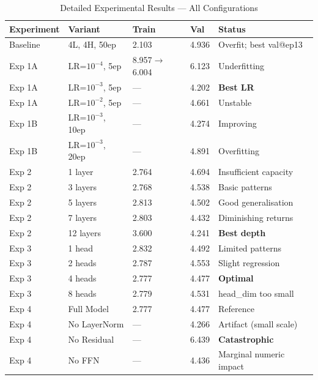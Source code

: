 \documentclass[12pt,a4paper]{article}
\begin{document}
\begin{table}[H]
\centering
\caption{Detailed Experimental Results — All Configurations}
\small\renewcommand{\arraystretch}{1.3}
\begin{tabular}{L{2.2cm}L{3cm}C{2cm}C{2cm}L{4cm}}
  \toprule
  \textbf{Experiment} & \textbf{Variant} & \textbf{Train} & \textbf{Val} & \textbf{Status} \\
  \midrule
  Baseline    & 4L, 4H, 50ep              & 2.103 & 4.936 & Overfit; best val@ep13 \\
  \midrule
  Exp 1A      & LR=$10^{-4}$, 5ep         & 8.957$\to$6.004 & 6.123 & Underfitting \\
  Exp 1A      & LR=$10^{-3}$, 5ep         & — & 4.202 & \textbf{Best LR} \\
  Exp 1A      & LR=$10^{-2}$, 5ep         & — & 4.661 & Unstable \\
  Exp 1B      & LR=$10^{-3}$, 10ep        & — & 4.274 & Improving \\
  Exp 1B      & LR=$10^{-3}$, 20ep        & — & 4.891 & Overfitting \\
  \midrule
  Exp 2       & 1 layer                   & 2.764 & 4.694 & Insufficient capacity \\
  Exp 2       & 3 layers                  & 2.768 & 4.538 & Basic patterns \\
  Exp 2       & 5 layers                  & 2.813 & 4.502 & Good generalisation \\
  Exp 2       & 7 layers                  & 2.803 & 4.432 & Diminishing returns \\
  Exp 2       & 12 layers                 & 3.600 & 4.241 & \textbf{Best depth} \\
  \midrule
  Exp 3       & 1 head                    & 2.832 & 4.492 & Limited patterns \\
  Exp 3       & 2 heads                   & 2.787 & 4.553 & Slight regression \\
  Exp 3       & 4 heads                   & 2.777 & 4.477 & \textbf{Optimal} \\
  Exp 3       & 8 heads                   & 2.779 & 4.531 & head\_dim too small \\
  \midrule
  Exp 4       & Full Model                & 2.777 & 4.477 & Reference \\
  Exp 4       & No LayerNorm              & —     & 4.266 & Artifact (small scale) \\
  Exp 4       & No Residual               & —     & 6.439 & \textbf{Catastrophic} \\
  Exp 4       & No FFN                    & —     & 4.436 & Marginal numeric impact \\
  \bottomrule
\end{tabular}
\end{table}
\end{document}
